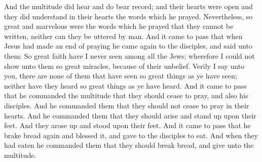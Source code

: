And the multitude did hear and do bear record; and their hearts were open and they did understand in their hearts the words which he prayed.
\bverse \iffalse Nevertheless, so great and marvelous were the words which he prayed that they cannot be written, neither can they be uttered by man. \fi
Nevertheless, so great and marvelous were the words which he prayed that they cannot be written, neither can they be uttered by man.
\bverse \iffalse And it came to pass that when Jesus had made an end of praying he came again to the disciples, and said unto them: So great faith have I never seen among all the Jews; wherefore I could not show unto them so great miracles, because of their unbelief. \fi
And it came to pass that when Jesus had made an end of praying he came again to the disciples, and said unto them: So great faith have I never seen among all the Jews; wherefore I could not show unto them so great miracles, because of their unbelief.
\bverse \iffalse Verily I say unto you, there are none of them that have seen so great things as ye have seen; neither have they heard so great things as ye have heard. \fi
Verily I say unto you, there are none of them that have seen so great things as ye have seen; neither have they heard so great things as ye have heard.
\bchapter
\bverse \iffalse And it came to pass that he commanded the multitude that they should cease to pray, and also his disciples. And he commanded them that they should not cease to pray in their hearts. \fi
And it came to pass that he commanded the multitude that they should cease to pray, and also his disciples. And he commanded them that they should not cease to pray in their hearts.
\bverse \iffalse And he commanded them that they should arise and stand up upon their feet. And they arose up and stood upon their feet. \fi
And he commanded them that they should arise and stand up upon their feet. And they arose up and stood upon their feet.
\bverse \iffalse And it came to pass that he brake bread again and blessed it, and gave to the disciples to eat. \fi
And it came to pass that he brake bread again and blessed it, and gave to the disciples to eat.
\bverse \iffalse And when they had eaten he commanded them that they should break bread, and give unto the multitude. \fi
And when they had eaten he commanded them that they should break bread, and give unto the multitude.
\bverse \iffalse And when they had given unto the multitude he also gave them wine to drink, and commanded them that they should give unto the multitude. \fi
